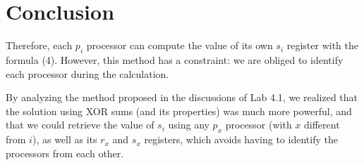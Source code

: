 \documentclass{article}
\begin{document}
\section{Conclusion}

Therefore, each $p_{i}$ processor can compute the value of its own $s_{i}$ register with the formula (4). However, this method has a constraint: we are obliged to identify each processor during the calculation.

\noindent By analyzing the method proposed in the discussions of Lab 4.1, we realized that the solution using XOR sums (and its properties) was much more powerful, and that we could retrieve the value of $s_{i}$ using any $p_{x}$ processor (with $x$ different from $i$), as well as its $r_{x}$ and $s_{x}$ registers, which avoids having to identify the processors from each other.
\end{document}
